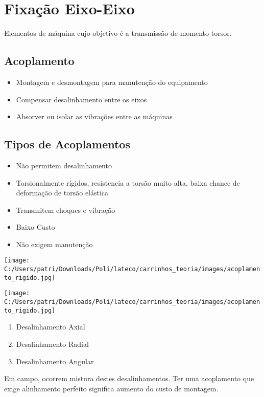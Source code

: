 \section{Fixação Eixo-Eixo}

Elementos de máquina cujo objetivo é a transmissão de momento torsor.

\subsection{Acoplamento}

\begin{itemize}
	\item Montagem e desmontagem para manutenção do equipamento
	\item Compensar desalinhamento entre os eixos
	\item Absorver ou isolar as vibrações entre as máquinas
\end{itemize}

\subsection{Tipos de Acoplamentos}

\begin{namedtheorem}[Rígidos]
	\begin{itemize}
		\item Não permitem desalinhamento
		\item Torsionalmente rígidos, resistencia a torsão muito alta, baixa chance de deformação de torsão elástica
		\item Transmitem choques e vibração
		\item Baixo Custo
		\item Não exigem manutenção
	\end{itemize}
	
	\begin{center}
\texttt{[image: C:/Users/patri/Downloads/Poli/lateco/carrinhos\_teoria/images/acoplamento\_rigido.jpg]}
	\end{center}
\end{namedtheorem}

\begin{namedtheorem}
	\begin{center}
	\texttt{[image: C:/Users/patri/Downloads/Poli/lateco/carrinhos\_teoria/images/acoplamento\_rigido.jpg]}
	\end{center}
	
	\begin{enumerate}
		\item Desalinhamento Axial
		\item Desalinhamento Radial
		\item Desalinhamento Angular
	\end{enumerate}
	
	Em campo, ocorrem mistura destes desalinhamentos. Ter uma acoplamento que exige alinhamento perfeito significa aumento do custo de montagem.
\end{namedtheorem}

